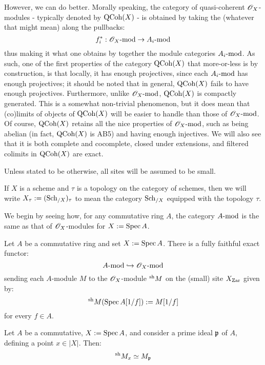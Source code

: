             However, we can do better. Morally speaking, the category of quasi-coherent $\scrO_X$-modules - typically denoted by $\QCoh(X)$ - is obtained by taking the  (whatever that might mean) along the pullbacks:
                $$f^*_i: \scrO_X\mod \to A_i\mod$$
            thus making it what one obtains by  together the module categories $A_i\mod$. As such, one of the first properties of the category $\QCoh(X)$ that more-or-less is by construction, is that locally, it has enough projectives, since each $A_i\mod$ has enough projectives; it should be noted that in general, $\QCoh(X)$ fails to have enough  projectives. Furthermore, unlike $\scrO_X\mod$, $\QCoh(X)$ is compactly generated. This is a somewhat non-trivial phenomenon, but it does mean that (co)limits of objects of $\QCoh(X)$ will be easier to handle than those of $\scrO_X\mod$. Of course, $\QCoh(X)$ retains all the nice properties of $\scrO_X\mod$, such as being abelian (in fact, $\QCoh(X)$ is AB5) and having enough injectives. We will also see that it is both complete and cocomplete, closed under extensions, and filtered colimits in $\QCoh(X)$ are exact.

            \begin{convention}
                Unless stated to be otherwise, all sites will be assumed to be small. 

                If $X$ is a scheme and $\tau$ is a topology on the category of schemes, then we will write $X_{\tau} := (\Sch_{/X})_{\tau}$ to mean the category $\Sch_{/X}$ equipped with the topology $\tau$. 

                
            \end{convention}

            We begin by seeing how, for any commutative ring $A$, the category $A\mod$ is the same as that of $\scrO_X$-modules for $X := \Spec A$. 
            \begin{lemma} \label{lemma: sheafifying_modules}
                Let $A$ be a commutative ring and set $X := \Spec A$. There is a fully faithful exact functor:
                    $$A\mod \hookrightarrow \scrO_X\mod$$
                sending each $A$-module $M$ to the $\scrO_X$-module ${}^{\sh}M$ on the (small) site $X_{\Zar}$ given by:
                    $${}^{\sh}M(\Spec A[1/f]) := M[1/f]$$
                for every $f \in A$. 
            \end{lemma}
            \begin{corollary}
                Let $A$ be a commutative, $X := \Spec A$, and consider a prime ideal $\p$ of $A$, defining a point $x \in |X|$. Then:
                    $${}^{\sh}M_x \cong M_{\p}$$
            \end{corollary}
            
